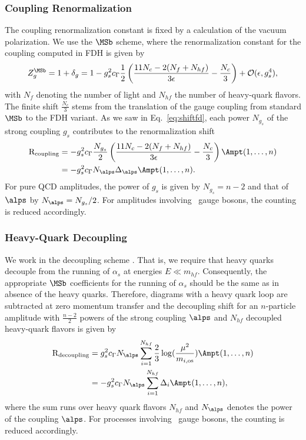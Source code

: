 \subsubsection{Coupling Renormalization}
The coupling renormalization constant is fixed by a
calculation of the
vacuum polarization. We use the $\MSb$ scheme, where the
renormalization constant for the coupling computed in FDH is given by
\begin{align}
 Z_g^{\MSb}=1+\delta_g=1-g_s^2c_\Gamma\frac{1}{2}\left(\frac{11N_c-2(N_f+N_{hf})}{3\epsilon}-\frac{N_c}{3}\right)
 + \mathcal{O}(\epsilon,g_s^4),
\end{align}
with $N_f$ denoting the number of light and $N_{hf}$ the
number of heavy-quark flavors. The finite shift $\frac{N_c}{3}$ stems
from the translation of the gauge coupling from standard $\MSb$ to the
FDH variant. As we saw in Eq.~\eqref{eq:shiftfd}, each power $N_{g_s}$ of the strong coupling $g_s$ contributes to the renormalization shift
\begin{align}
\begin{split}
 \text{R}_{\text{coupling}} &= -g_s^{2}c_\Gamma \frac{N_{g_s}}{2}
 \left(\frac{11N_c-2(N_f+N_{hf})}{3\epsilon}-\frac{N_c}{3}\right)\Ampt(1,\dots,n)\\
 &= -g_s^{2}c_\Gamma N_{\alps} \Delta_{\alps}\Ampt(1,\dots,n).
\end{split}
\end{align}
For pure QCD amplitudes, the power of $g_s$ is given by
$N_{g_s}=n-2$ and that of $\alps$ by $N_{\alps}=N_{g_s}/2$. For amplitudes
involving \ew~gauge bosons, the counting is reduced accordingly.
\subsubsection{Heavy-Quark Decoupling}
We work in the decoupling scheme \cite{Collins1978a}. That is, we require
that heavy quarks decouple from the running of
$\alpha_s$ at energies $E\ll m_{hf}$. Consequently, the appropriate $\MSb$ coefficients for the
running of $\alpha_s$ should be the same as in absence of the heavy
quarks. Therefore, diagrams with a heavy quark loop
are subtracted at zero momentum transfer and the decoupling shift for an
$n$-particle amplitude with $\frac{n-2}{2}$ powers of the strong
coupling $\alps$ and $N_{hf}$ decoupled heavy-quark flavors is
given by
\begin{align}
\begin{split}
\text{R}_{\text{decoupling}}&= g_s^{2}c_\Gamma
N_{\alps}\sum_{i=1}^{N_{hf}}
\frac{2}{3}\log(\frac{\mu^2}{m_{i,\text{os}}}) \Ampt(1,\dots,n)\\
&= -g_s^{2}c_\Gamma N_{\alps}\sum_{i=1}^{N_{hf}}
\Delta_i\Ampt(1,\dots,n),
\end{split}
\end{align}
where the sum runs over heavy quark flavors $N_{hf}$ and $N_{\alps}$ denotes the power of the coupling $\alps$. For processes involving \ew~gauge bosons, the counting is
reduced accordingly.


